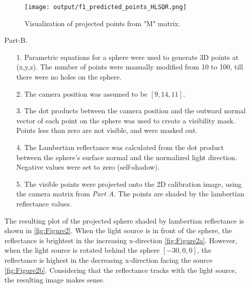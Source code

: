 \documentclass[12pt]{report}
\begin{document}
\begin{enumerate}
    \begin{figure}[H]
        \centering
        \texttt{[image: output/f1\_predicted\_points\_HLSQR.png]}
        \caption{Visualization of projected points from "M" matrix.}
        \label{fig:Figure1}
    \end{figure}

    \FloatBarrier 

    \item[Part-B.]
    \ \\
    \begin{enumerate}
        \item[1.] Parametric equations for a sphere were used to generate 3D points at (x,y,z). The number of points were manually modified from 10 to 
        100, till there were no holes on the sphere.
        \item[2.] The camera position was assumed to be $[9, 14, 11]$.
        \item[3.] The dot products between the camera position and the outward normal vector of each point on the sphere was used to create a visibility 
        mask. Points less than zero are not visible, and were masked out.
        \item[4.] The Lambertian reflectance was calculated from the dot product between the sphere's surface normal and the normalized light direction. 
        Negative values were set to zero (self-shadow).
        \item[5.] The visible points were projected onto the 2D calibration image, using the camera matrix from \emph{Part A}. The points are shaded by 
        the lambertian reflectance values.
    \end{enumerate}
    The resulting plot of the projected sphere shaded by lambertian reflectance is shown in \autoref{fig:Figure2}. When the light source is in front of 
    the sphere, the reflectance is brightest in the increasing x-direction \autoref{fig:Figure2a}. However, when the light source is rotated behind the 
    sphere $[-30, 0, 0]$, the reflectance is highest in the decreasing x-direction facing the source \autoref{fig:Figure2b}. Considering that the reflectance 
    tracks with the light source, the resulting image makes sense.



\end{enumerate}
\end{document}

